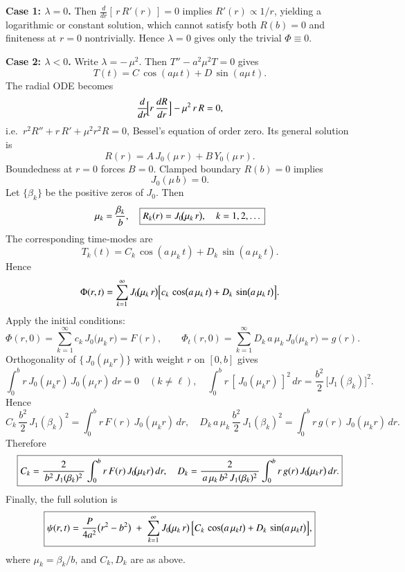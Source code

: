 \documentclass{report}
\begin{document}
\textbf{Case 1: \(\lambda = 0\).}  Then \(\frac{d}{dr}[\,r\,R'(r)\,]=0\) implies \(R'(r)\propto 1/r\), yielding a logarithmic or constant solution, which cannot satisfy both \(R(b)=0\) and finiteness at \(r=0\) nontrivially.  Hence \(\lambda=0\) gives only the trivial \(\Phi\equiv0\).

\textbf{Case 2: \(\lambda < 0\).}  Write \(\lambda = -\,\mu^{2}\).  Then \(T'' - a^{2}\mu^{2}T = 0\) gives 
\[
T(t) = C\,\cos(a\mu\,t) + D\,\sin(a\mu\,t).
\]
The radial ODE becomes
\[
\frac{d}{dr}\!\Bigl[r\,\frac{dR}{dr}\Bigr] - \mu^{2}\,r\,R = 0,
\]
i.e.\ \(r^{2}R'' + r\,R' + \mu^{2}r^{2}R = 0\), Bessel’s equation of order zero.  Its general solution is
\[
R(r) = A\,J_{0}(\mu\,r) + B\,Y_{0}(\mu\,r).
\]
Boundedness at \(r=0\) forces \(B=0\).  Clamped boundary \(R(b)=0\) implies
\[
J_{0}(\mu\,b) = 0.
\]
Let \(\{\beta_{k}\}\) be the positive zeros of \(J_{0}\).  Then
\[
\mu_{k} = \frac{\beta_{k}}{b}, 
\quad
\boxed{%
R_{k}(r) = J_{0}\!\bigl(\mu_{k}\,r\bigr), 
\quad k=1,2,\dots
}
\]
The corresponding time‐modes are
\[
T_{k}(t) = C_{k}\,\cos(a\,\mu_{k}\,t) + D_{k}\,\sin(a\,\mu_{k}\,t).
\]
Hence 
\[
\Phi(r,t) 
= \sum_{k=1}^{\infty} J_{0}\!\bigl(\mu_{k}\,r\bigr)
\Bigl[c_{k}\,\cos\bigl(a\,\mu_{k}\,t\bigr)
+ D_{k}\,\sin\bigl(a\,\mu_{k}\,t\bigr)\Bigr].
\]
Apply the initial conditions:
\[
\Phi(r,0) = \sum_{k=1}^{\infty} c_{k}\,J_{0}\!\bigl(\mu_{k}\,r\bigr) 
= F(r),
\qquad
\Phi_{t}(r,0) = \sum_{k=1}^{\infty} D_{k}\,a\,\mu_{k}\,J_{0}\!\bigl(\mu_{k}\,r\bigr) 
= g(r).
\]
Orthogonality of \(\{\,J_{0}(\mu_{k}r)\}\) with weight \(r\) on \([0,b]\) gives
\[
\int_{0}^{b} r\,J_{0}(\mu_{k}r)\,J_{0}(\mu_{\ell}r)\,dr 
= 0\quad (k\neq \ell),
\quad
\int_{0}^{b} r\,[\,J_{0}(\mu_{k}r)\,]^{2}\,dr 
= \frac{b^{2}}{2}\,\bigl[J_{1}(\beta_{k})\bigr]^{2}.
\]
Hence
\[
C_{k}\,\frac{b^{2}}{2}\,J_{1}(\beta_{k})^{2} 
= \int_{0}^{b} r\,F(r)\,J_{0}(\mu_{k}r)\,dr,
\quad 
D_{k}\,a\,\mu_{k}\,\frac{b^{2}}{2}\,J_{1}(\beta_{k})^{2} 
= \int_{0}^{b} r\,g(r)\,J_{0}(\mu_{k}r)\,dr.
\]
Therefore
\[
\boxed{%
C_{k} = \frac{2}{\,b^{2}\,J_{1}(\beta_{k})^{2}\,}
\int_{0}^{b} r\,F(r)\,J_{0}\!\bigl(\mu_{k}r\bigr)\,dr,
\quad
D_{k} = \frac{2}{\,a\,\mu_{k}\,b^{2}\,J_{1}(\beta_{k})^{2}\,}
\int_{0}^{b} r\,g(r)\,J_{0}\!\bigl(\mu_{k}r\bigr)\,dr.
}
\]
Finally, the full solution is
\[
\boxed{%
\psi(r,t) 
= \frac{P}{4a^{2}}\bigl(r^{2} - b^{2}\bigr) 
\;+\; 
\sum_{k=1}^{\infty} J_{0}\!\bigl(\mu_{k}\,r\bigr)\,
\Bigl[C_{k}\,\cos\bigl(a\,\mu_{k} t\bigr) 
+ D_{k}\,\sin\bigl(a\,\mu_{k} t\bigr)\Bigr],
}
\]
where \(\mu_{k} = \beta_{k}/b\), and \(C_{k},D_{k}\) are as above.
\end{document}
